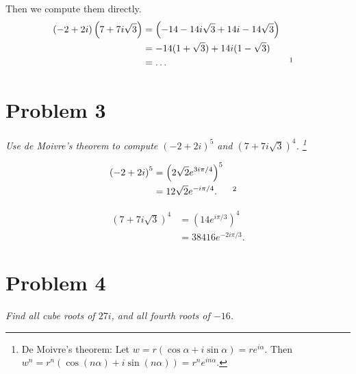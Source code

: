 \documentclass{tufte-handout}
\begin{document}
Then we compute them directly.
\begin{align*}
  (-2 + 2i)\left(7 + 7i\sqrt 3 \right) &= \left(-14 - 14 i \sqrt 3 + 14i
                                         -14 \sqrt 3\right)\\
                                       &= -14(1 + \sqrt 3) + 14i(1 -
                                         \sqrt 3)\\
                                       &= \ldots && \footnotemark
\end{align*}

\section{Problem 3}

\begin{description}
\item \textit{Use de Moivre's theorem to compute $(-2 + 2i)^5$ and
    $(7 + 7i\sqrt 3)^4$. \footnote{De Moivre's theorem: Let
      $w = r(\cos\alpha + i\sin\alpha) = re^{i\alpha}.$ Then
      $w^n = r^n(\cos(n\alpha) + i\sin(n\alpha)) = r^n
      e^{in\alpha}$.}}
\end{description}

\begin{align*}
  {(-2 + 2i)}^5 &= {\left(2 \sqrt 2 e^{3 i \pi / 4} \right)}^5\\
                &= 12 \sqrt 2 e^{-i \pi / 4}. && \footnotemark
\end{align*}

\begin{align*}
  {\left( 7 + 7 i \sqrt 3 \right)}^4 &= {\left( 14 e^{i \pi / 3}
                                       \right)}^4\\
                                     &= 38416 e^{-2 i \pi / 3}.
\end{align*}

\section{Problem 4}

\begin{description}
\item \textit{Find all cube roots of $27i$, and all fourth roots of
    $-16$.}
\end{description}
\end{document}
